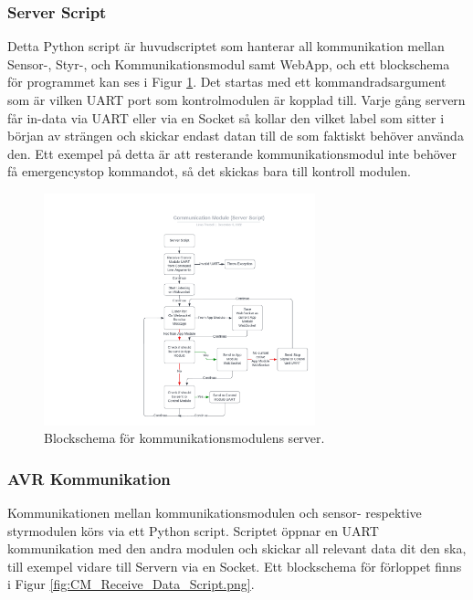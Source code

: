 \documentclass[10pt,oneside,swedish]{lips}
\begin{document}
\subsubsection{Server Script}
Detta Python script är huvudscriptet som hanterar all kommunikation mellan Sensor-, Styr-, och Kommunikationsmodul samt WebApp, och ett blockschema för programmet kan ses i Figur \ref{fig:CM_Server_Script.png}.
Det startas med ett kommandradsargument som är vilken UART port som kontrolmodulen är kopplad till.
Varje gång servern får in-data via UART eller via en Socket så kollar den vilket label som sitter i början av strängen och skickar endast datan till de som faktiskt behöver använda den. Ett exempel på detta är att resterande kommunikationsmodul inte behöver få emergencystop kommandot, så det skickas bara till kontroll modulen.

\begin{figure}[htbp]
  \centering
  \includegraphics[width=0.7\textwidth]{./Figures/CM_Server_Script.png}
  \caption{Blockschema för kommunikationsmodulens server.}
  \label{fig:CM_Server_Script.png}
\end{figure}

\subsubsection{AVR Kommunikation}
Kommunikationen mellan kommunikationsmodulen och sensor- respektive styrmodulen körs via ett Python script. Scriptet öppnar en UART kommunikation med den andra modulen och skickar all relevant data dit den ska, till exempel vidare till Servern via en Socket. Ett blockschema för förloppet finns i Figur \ref{fig:CM_Receive_Data_Script.png}.
\end{document}
